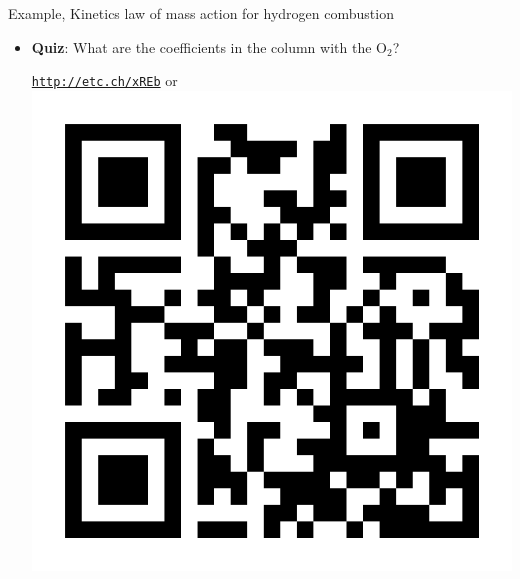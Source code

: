 \begin{frame}{Example, Kinetics law of mass action for hydrogen combustion}
\begin{itemize}
{{\[{				R_2 & -1 &  0 & 0 & 0 & 1 & -1 & 1 & 0\\[10pt]
				R_3 &   1 & -1 & 0 & 1 & 0 & 0 & -1 & 0\\[5pt]
				R_4 &  1 & -1 & 0 & 0 & -1 & 0 & 1 & 0\\[5pt]
				R_5 & -1 &  0 & 1 & 0 & 0 & -1 & 0 & 0\\[5pt]
				R_6 &  0 &  0 & -1 & 1 & 0 & 0 & 0 & 0\\[5pt]
			}
			\]
			}
			}
			\ecol
	\vskip -15pt 
	\item \alert{\bf Quiz}: What are the coefficients in the column with the O$_2$? \\[5pt]
	\begin{center}
		\href{http://etc.ch/xREb}{\textcolor{indigo(dye)}{\tt http://etc.ch/xREb}} \quad or \quad
		\includegraphics[height=0.1\columnwidth]{figures/chemical-kinetics/polls.png}
	\end{center}
	\end{itemize}
\end{frame}
%
